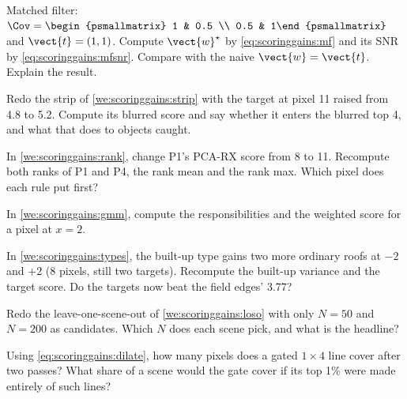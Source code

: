 \begin{checkyourself}
\item\label{ex:scoringgains:1} Matched filter: $\Cov = \begin{psmallmatrix} 1 & 0.5 \\ 0.5 & 1\end{psmallmatrix}$ and
  $\vect{t} = (1, 1)$. Compute $\vect{w}^\star$ by \eqref{eq:scoringgains:mf} and its SNR by \eqref{eq:scoringgains:mfsnr}.
  Compare with the naive $\vect{w} = \vect{t}$. Explain the result.
\item\label{ex:scoringgains:2} Redo the strip of \cref{we:scoringgains:strip} with the target at pixel 11 raised from 4.8 to
  5.2. Compute its blurred score and say whether it enters the blurred top 4, and what that does to objects caught.
\item\label{ex:scoringgains:3} In \cref{we:scoringgains:rank}, change P1's PCA-RX score from 8 to 11. Recompute both ranks of
  P1 and P4, the rank mean and the rank max. Which pixel does each rule put first?
\item\label{ex:scoringgains:4} In \cref{we:scoringgains:gmm}, compute the responsibilities and the weighted score for a pixel
  at $x = 2$.
\item\label{ex:scoringgains:5} In \cref{we:scoringgains:types}, the built-up type gains two more ordinary roofs at $-2$ and
  $+2$ (8 pixels, still two targets). Recompute the built-up variance and the target score. Do the targets now beat the field
  edges' 3.77?
\item\label{ex:scoringgains:6} Redo the leave-one-scene-out of \cref{we:scoringgains:loso} with only $N = 50$ and $N = 200$
  as candidates. Which $N$ does each scene pick, and what is the headline?
\item\label{ex:scoringgains:7} Using \eqref{eq:scoringgains:dilate}, how many pixels does a gated $1 \times 4$ line cover after
  two passes? What share of a scene would the gate cover if its top 1\% were made entirely of such lines?
\end{checkyourself}
\endgroup

